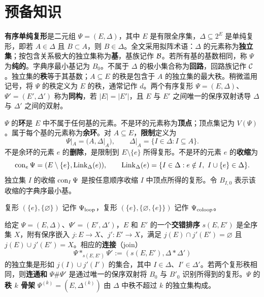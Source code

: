 \section{预备知识}
\textbf{有序单纯复形}是二元组 $\Psi=(E,\Delta)$，其中 $E$ 是有限全序集，$\Delta\subseteq2^E$ 是单纯复形，即若 $A\in\Delta$ 且 $B\subset A$，则 $B\in\Delta$。全文采用拟阵术语：$\Delta$ 的元素称为\textbf{独立集}；按包含关系极大的独立集称为\textbf{基}，基族记作 $\mathcal B$。若所有基的基数相同，称 $\Psi$ 为\textbf{纯的}。字典序最小基记为 $B_0$。不属于 $\Delta$ 的极小集合称为\textbf{回路}，回路族记作 $\mathcal C$。独立集的\textbf{秩}等于其基数；$A\subseteq E$ 的秩是包含于 $A$ 的独立集的最大秩。稍微滥用记号，将 $\Psi$ 的秩定义为 $E$ 的秩，通常记作 $d$。两个有序复形 $\Psi=(E,\Delta)$、$\Psi'=(E',\Delta')$ 称为\textbf{同构}，若 $|E|=|E'|$，且 $E$ 与 $E'$ 之间唯一的保序双射诱导 $\Delta$ 与 $\Delta'$ 之间的双射。

$\Psi$ 的\textbf{环}是 $E$ 中不属于任何基的元素。不是环的元素称为\textbf{顶点}；顶点集记为 $V(\Psi)$。属于每个基的元素称为\textbf{余环}。对 $A\subseteq E$，\textbf{限制}定义为
\[
\Psi|_A=(A,\Delta|_A),\qquad \Delta|_A=\{I\in\Delta:I\subseteq A\}.
\]
不是余环的元素 $e$ 的\textbf{删除}，是限制到 $E\setminus\{e\}$ 所得复形。不是环的元素 $e$ 的\textbf{收缩}为
\[
\con_e\Psi=(E\setminus\{e\},\operatorname{Link}_\Delta(e)),\qquad
\operatorname{Link}_\Delta(e)=\{I\in\Delta:e\notin I,\ I\cup\{e\}\in\Delta\}.
\]
独立集 $I$ 的收缩 $\operatorname{con}_I\Psi$ 是按任意顺序收缩 $I$ 中顶点所得的复形。令 $B_{I,0}$ 表示该收缩的字典序最小基。

复形 $(\{e\},\{\varnothing\})$ 记作 $\Psi_{\rm loop}$，复形 $(\{e\},\{\varnothing,\{e\}\})$ 记作 $\Psi_{\rm coloop}$。

给定 $\Psi=(E,\Delta)$、$\Psi'=(E',\Delta')$，$E$ 和 $E'$ 的一个\textbf{交错排序} $s(E,E')$ 是全序集 $X$，附有保序嵌入 $j:E\to X$、$j':E'\to X$，满足 $j(E)\cap j'(E')=\varnothing$ 且 $j(E)\cup j'(E')=X$。相应的\textbf{连接}（join）
\[
\Psi*_{s(E,E')}\Psi':=(s(E,E'),\Delta*\Delta')
\]
的独立集是形如 $j(I)\cup j'(I')$ 的集合，其中 $I\in\Delta$、$I'\in\Delta'$。若两个复形秩相同，则\textbf{连通和} $\Psi\#\Psi'$ 是通过唯一的保序双射将 $B_0$ 与 $B'_0$ 识别所得到的复形。$\Psi$ 的\textbf{秩 $k$ 骨架} $\Psi^{(k)}=(E,\Delta^{(k)})$ 由 $\Delta$ 中秩不超过 $k$ 的独立集构成。

